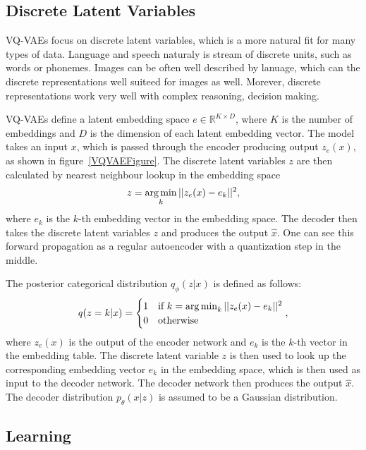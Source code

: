\subsection{Discrete Latent Variables}

VQ-VAEs focus on discrete latent variables, which is a more natural fit for many types of data. Language and speech naturaly is stream of discrete units, such as words or phonemes. Images can be often well described by lanuage, which can the discrete representations well suiteed for images as well. Morever, discrete representations work very well with complex reasoning, decision making.\cite{vqvae}

VQ-VAEs define a latent embedding space $ e \in \mathbb{R}^{K \times D} $, where $K$ is the number of embeddings and $D$ is the dimension of each latent embedding vector. The model takes an input $x$, which is passed through the encoder producing output $z_e(x)$, as shown in figure~\ref{VQVAEFigure}. 
The discrete latent variables $z$ are then calculated by nearest neighbour lookup in the embedding space
 \[ z = \operatorname*{arg\,min}_{k} || z_e(x) - e_k ||^2,\] 
where $e_k$ is the $k$-th embedding vector in the embedding space. The decoder then takes the discrete latent variables $z$ and produces the output $\hat{x}$. 
One can see this forward propagation as a regular autoencoder with a quantization step in the middle.\cite{vqvae}

The posterior categorical distribution $q_{\phi}(z|x)$ is defined as follows:
\begin{equation} \label{eqVQVAEPosterior}
    q(z=k|x) = \begin{cases}
        1& \text{if} \ k = \operatorname*{arg\,min}_{k} || z_e(x) - e_k ||^2 \\
        0& \text{otherwise}
    \end{cases},
\end{equation}
where $z_e(x)$ is the output of the encoder network and $e_k$ is the $k$-th vector in the embedding table.
The discrete latent variable $z$ is then used to look up the corresponding embedding vector $e_k$ in the embedding space, which is then used as input to the decoder network. The decoder network then produces the output $\hat{x}$.\cite{vqvae}
The decoder distribution $p_{\theta}(x|z)$ is assumed to be a Gaussian distribution.

\subsection{Learning}

